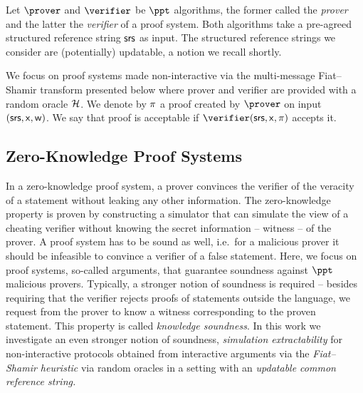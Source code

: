 \noindent Let $\prover$ and $\verifier$ be $\ppt$ algorithms, the former called the \emph{prover}
and the latter the \emph{verifier} of a proof system. Both algorithms take a pre-agreed structured reference string $\mathsf{srs}$ as input. The structured reference strings we consider are (potentially) updatable, a notion we recall shortly.

We focus on proof systems made non-interactive via the multi-message Fiat--Shamir transform presented below where prover and
verifier are provided with a random oracle $\mathcal{H}$. 
We denote by $\pi$ a proof created by $\prover$ on input
$(\mathsf{srs}, \mathsf{x}, \mathsf{w})$. We say that proof is acceptable if $\verifier(\srs, \inp,
\zkproof)$ accepts it.





  
\iffalse
\subsection{Zero-Knowledge Proof Systems}\label{prelim:nizk}
In a zero-knowledge proof system, a prover convinces the verifier of the veracity of a statement
without leaking any other information. The zero-knowledge property is proven by constructing a
simulator that can simulate the view of a cheating verifier without knowing the secret
information -- witness -- of the prover. A proof system has to be sound as well, i.e.~for a
malicious prover it should be infeasible to convince a verifier of a false statement. Here, we
focus on proof systems, so-called arguments, that guarantee soundness against $\ppt$ malicious provers. 
Typically, a stronger notion of soundness is required -- besides requiring that the
verifier rejects proofs of statements outside the language, we request from the
prover to know a witness corresponding to the proven statement. This property is
called \emph{knowledge soundness}. In this work we investigate an even stronger notion of soundness, \emph{simulation extractability} for non-interactive protocols obtained from interactive arguments via the \emph{Fiat--Shamir heuristic} via random oracles in a setting with an \emph{updatable common reference string.} 

